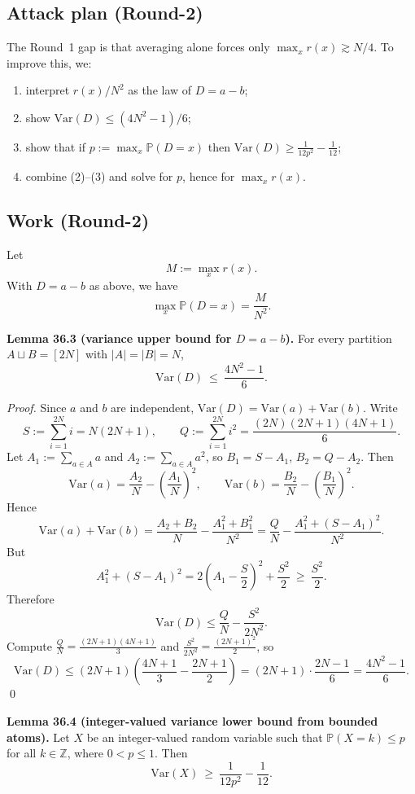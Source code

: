 \subsection{Attack plan (Round-2)}
The Round~1 gap is that averaging alone forces only \(\max_x r(x)\gtrsim N/4\).
To improve this, we:
\begin{enumerate}
\item interpret \(r(x)/N^2\) as the law of \(D=a-b\);
\item show \(\mathrm{Var}(D)\le (4N^2-1)/6\);
\item show that if \(p:=\max_x\mathbb P(D=x)\) then
\(\mathrm{Var}(D)\ge \frac{1}{12p^2}-\frac{1}{12}\);
\item combine (2)--(3) and solve for \(p\), hence for \(\max_x r(x)\).
\end{enumerate}

\subsection{Work (Round-2)}
Let
\[
M:=\max_x r(x).
\]
With \(D=a-b\) as above, we have
\[
\max_x\mathbb P(D=x)=\frac{M}{N^2}.
\]

\medskip
\noindent\textbf{Lemma 36.3 (variance upper bound for \(D=a-b\)).}
For every partition \(A\sqcup B=[2N]\) with \(|A|=|B|=N\),
\[
\mathrm{Var}(D)\ \le\ \frac{4N^2-1}{6}.
\]

\noindent\emph{Proof.}
Since \(a\) and \(b\) are independent,
\(\mathrm{Var}(D)=\mathrm{Var}(a)+\mathrm{Var}(b)\).
Write
\[
S:=\sum_{i=1}^{2N} i = N(2N+1),\qquad
Q:=\sum_{i=1}^{2N} i^2=\frac{(2N)(2N+1)(4N+1)}{6}.
\]
Let
\(A_1:=\sum_{a\in A}a\) and \(A_2:=\sum_{a\in A}a^2\), so
\(B_1=S-A_1\), \(B_2=Q-A_2\).
Then
\[
\mathrm{Var}(a)=\frac{A_2}{N}-\left(\frac{A_1}{N}\right)^2,
\qquad
\mathrm{Var}(b)=\frac{B_2}{N}-\left(\frac{B_1}{N}\right)^2.
\]
Hence
\[
\mathrm{Var}(a)+\mathrm{Var}(b)
=\frac{A_2+B_2}{N}-\frac{A_1^2+B_1^2}{N^2}
=\frac{Q}{N}-\frac{A_1^2+(S-A_1)^2}{N^2}.
\]
But
\[
A_1^2+(S-A_1)^2
=2\left(A_1-\frac{S}{2}\right)^2+\frac{S^2}{2}\ \ge\ \frac{S^2}{2}.
\]
Therefore
\[
\mathrm{Var}(D)\le \frac{Q}{N}-\frac{S^2}{2N^2}.
\]
Compute
\(\frac{Q}{N}=\frac{(2N+1)(4N+1)}{3}\) and
\(\frac{S^2}{2N^2}=\frac{(2N+1)^2}{2}\), so
\[
\mathrm{Var}(D)
\le (2N+1)\left(\frac{4N+1}{3}-\frac{2N+1}{2}\right)
=(2N+1)\cdot\frac{2N-1}{6}
=\frac{4N^2-1}{6}.
\]
\qed

\medskip
\noindent\textbf{Lemma 36.4 (integer-valued variance lower bound from bounded atoms).}
Let \(X\) be an integer-valued random variable such that
\(\mathbb P(X=k)\le p\) for all \(k\in\mathbb Z\), where \(0<p\le 1\).
Then
\[
\mathrm{Var}(X)\ \ge\ \frac{1}{12p^2}-\frac{1}{12}.
\]

